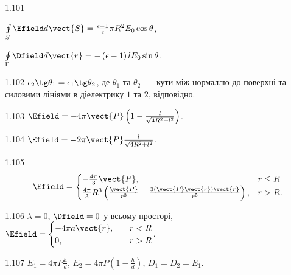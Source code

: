 \begin{Solution}{1.{101}}
	\begin{enumerate*}[label=\alph*)]
		\item $\oint\limits_{S} \Efield d\vect{S} = \frac{\epsilon  -1}{\epsilon} \pi R^2 E_0 \cos\theta$,
		\item $\oint\limits_{\Gamma} \Dfield d\vect{r} = - \left( \epsilon -1\right)  l E_0 \sin\theta$.
	\end{enumerate*}
	
\end{Solution}
\begin{Solution}{1.{102}}
		$\epsilon_2 \tg\theta_1 = \epsilon_1 \tg\theta_2$, де $\theta_1$ та $\theta_2$~--- кути між нормаллю до поверхні та силовими лініями в діелектрику $1$ та $2$, відповідно.
	
\end{Solution}
\begin{Solution}{1.{103}}
	$\Efield = -4\pi \vect{P} \left( 1 - \frac{l}{\sqrt{4R^2 + l^2}}\right)$.
\end{Solution}
\begin{Solution}{1.{104}}
	$\Efield = -2\pi \vect{P} \frac{l}{\sqrt{4R^2 + l^2}}$.
\end{Solution}
\begin{Solution}{1.{105}}
	\[
	\Efield =
	\begin{cases}
	- \frac{4\pi}{3}\vect{P},                                                                                   & r \le R \\
	\frac{4\pi}{3}R^3\left( \frac{\vect{P}}{r^3} + \frac{3\left(\vect{P}\vect{r}\right)\vect{r} }{r^5}\right) , & r > R.
	\end{cases}
	\]
\end{Solution}
\begin{Solution}{1.{106}}
	$\lambda = 0$,
	$\Dfield = 0$ у всьому просторі,
	$\Efield = %
		\begin{cases}
			- 4\pi  a  \vect{r}, & \quad r < R \\
			0,                              & \quad r > R
		\end{cases}
	$.
\end{Solution}
\begin{Solution}{1.{107}}
		$E_1 = 4\pi P\frac{h}{d}$, $E_2  =4\pi P \left( 1 - \frac{h}{d}\right) $, $D_1 = D_2 = E_1$.
	
\end{Solution}
